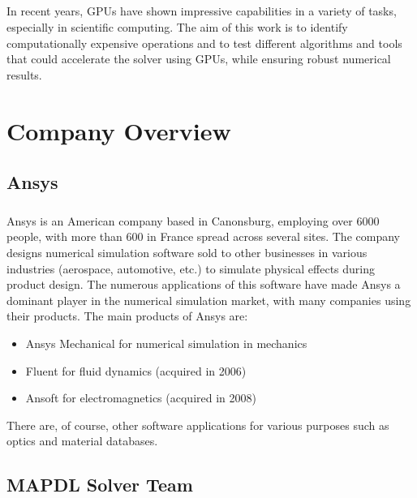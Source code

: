 \paragraph*{}
In recent years, GPUs have shown impressive capabilities in a variety of tasks, especially in scientific computing. The aim of this work is to identify computationally expensive operations and to test different algorithms and tools that could accelerate the solver using GPUs, while ensuring robust numerical results. 


\tableofcontents
\newpage

\listoffigures
\newpage

\listofalgorithms

\printglossaries
\newpage



\chapter{Company Overview}
\section{Ansys}
\paragraph*{}
Ansys is an American company based in Canonsburg, employing over 6000 people, with more than 600 in France spread across several sites. The company designs numerical simulation software sold to other businesses in various industries (aerospace, automotive, etc.) to simulate physical effects during product design. The numerous applications of this software have made Ansys a dominant player in the numerical simulation market, with many companies using their products. The main products of Ansys are:
\begin{itemize}
    \item Ansys Mechanical for numerical simulation in mechanics
    \item Fluent for fluid dynamics (acquired in 2006)
    \item Ansoft for electromagnetics (acquired in 2008)
\end{itemize}
There are, of course, other software applications for various purposes such as optics and material databases.

\section{MAPDL Solver Team}

